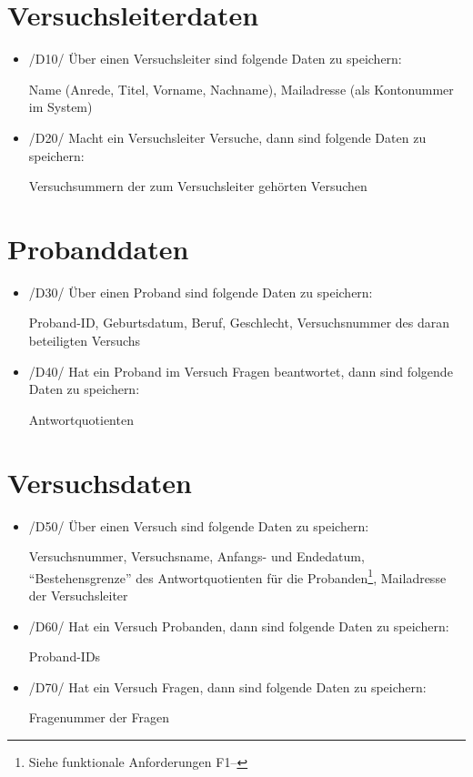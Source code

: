 \documentclass[a4paper]{scrreprt}
\begin{document}
        \section{Versuchsleiterdaten}
            \begin{itemize}
                \item /D10/ Über einen Versuchsleiter sind folgende Daten zu speichern:
                    \par Name (Anrede, Titel, Vorname, Nachname), Mailadresse (als Kontonummer im System)

                \item /D20/ Macht ein Versuchsleiter Versuche, dann sind folgende Daten zu speichern:
                    \par Versuchsummern der zum Versuchsleiter gehörten Versuchen
            \end{itemize}

        \section{Probanddaten}
            \begin{itemize}
                \item /D30/ Über einen Proband sind folgende Daten zu speichern:
                    \par Proband-ID, Geburtsdatum, Beruf, Geschlecht, Versuchsnummer des daran beteiligten Versuchs

                \item /D40/ Hat ein Proband im Versuch Fragen beantwortet, dann sind folgende Daten zu speichern:
                    \par Antwortquotienten
            \end{itemize}

        \section{Versuchsdaten}
            \begin{itemize}
                \item /D50/ Über einen Versuch sind folgende Daten zu speichern:
                    \par Versuchsnummer, Versuchsname, Anfangs- und Endedatum, “Bestehensgrenze” des Antwortquotienten für die Probanden\footnote{Siehe funktionale Anforderungen F1--}, Mailadresse der Versuchsleiter

                \item /D60/ Hat ein Versuch Probanden, dann sind folgende Daten zu speichern:
                    \par Proband-IDs

                \item /D70/ Hat ein Versuch Fragen, dann sind folgende Daten zu speichern:
                    \par Fragenummer der Fragen
            \end{itemize}
\end{document}
